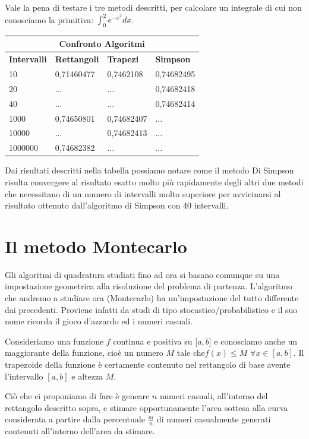 \documentclass{article}
\begin{document}
Vale la pena di testare i tre metodi descritti, per calcolare un integrale di cui non conosciamo la primitiva: $\int_0^2e^{-x^2}dx$.

\hfill

\begin{tabular}{ |p{3cm}||p{3cm}|p{3cm}|p{3cm}|  }
 \hline
 \multicolumn{4}{|c|}{Confronto Algoritmi} \\
 \hline
 \textbf{Intervalli}& \textbf{Rettangoli} & \textbf{Trapezi}& \textbf{Simpson}\\
 \hline
10  & 0,71460477    &0,7462108&  0,74682495\\
 20&   ...  & ...  &0,74682418\\
 40 &... & ...&  0,74682414\\
 1000    &0,74650801 & 0,74682407&  ...\\
 10000&   ...  & 0,74682413 & ...
\\
 1000000& 0,74682382  & ...   &...\\
 \hline
\end{tabular}

\hfill

Dai risultati descritti nella tabella possiamo notare come il metodo Di Simpson risulta convergere al risultato esatto molto più rapidamente degli altri due metodi che necessitano di un numero di intervalli molto superiore per avvicinarsi al risultato ottenuto dall'algoritmo di Simpson con 40 intervalli.

\newpage

\section{Il metodo Montecarlo}
Gli algoritmi di quadratura studiati fino ad ora si basano comunque su una impostazione geometrica alla risoluzione del problema di partenza. L'algoritmo che andremo a studiare ora (Montecarlo) ha un’impostazione del tutto differente dai precedenti. Proviene infatti da studi di tipo stocastico/probabilistico e il suo nome ricorda il gioco d’azzardo ed i numeri casuali.

Consideriamo una funzione $f$ continua e positiva su $[a,b$] e conosciamo anche un maggiorante della funzione, cioè un numero $M$ tale che$ f(x)\le M$ $\forall x\in [a,b]$. Il trapezoide della funzione è certamente contenuto nel rettangolo di base avente l’intervallo $[a,b]$ e altezza $M$.

Ciò che ci proponiamo di fare è geneare $n$ numeri casuali, all'interno del rettangolo descritto sopra, e stimare opportunamente l'area sottesa alla curva considerata a partire dalla percentuale $\frac{m}{n}$ di numeri casualmente generati contenuti all'interno dell'area da stimare.
\end{document}
